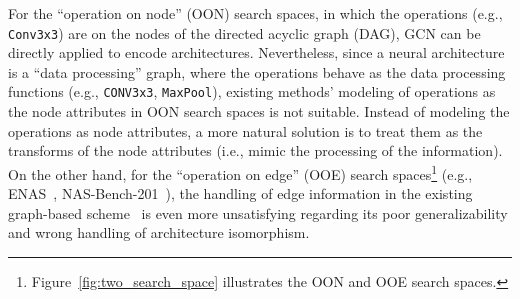 \documentclass[runningheads]{llncs}
\begin{document}
For the ``operation on node'' (OON) search spaces, in which the operations (e.g., \texttt{Conv3x3}) are on the nodes of the directed acyclic graph (DAG), GCN can be directly applied to encode architectures.
Nevertheless, since a neural architecture is a ``data processing'' graph, where the operations behave as the data processing functions (e.g., \texttt{CONV3x3}, \texttt{MaxPool}), existing methods' modeling of operations as the node attributes in OON search spaces is not suitable. Instead of modeling the operations as node attributes, a more natural solution is to treat them as the transforms of the node attributes (i.e., mimic the processing of the information).
On the other hand, for the ``operation on edge'' (OOE) search spaces\footnote{Figure~\ref{fig:two_search_space} illustrates the OON and OOE search spaces.} (e.g., ENAS~\cite{pham2018efficient}, NAS-Bench-201~\cite{Dong2020NAS-Bench-201}), the handling of edge information in the existing graph-based scheme~\cite{guo2019nat} is even more unsatisfying regarding its poor generalizability and wrong handling of architecture isomorphism. %




\end{document}
